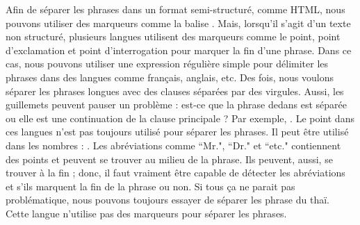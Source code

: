 \documentclass{KodeBook}
\begin{document}
Afin de séparer les phrases dans un format semi-structuré, comme HTML, nous pouvons utiliser des marqueurs comme la balise .
Mais, lorsqu'il s'agit d'un texte non structuré, plusieurs langues utilisent des marqueurs comme le point, point d'exclamation et point d'interrogation pour marquer la fin d'une phrase. 
Dans ce cas, nous pouvons utiliser une expression régulière simple \expword{/[.?!]/} pour délimiter les phrases dans des langues comme français, anglais, etc.
Des fois, nous voulons séparer les phrases longues avec des clauses séparées par des virgules.
Aussi, les guillemets peuvent pauser un problème : est-ce que la phrase dedans est séparée ou elle est une continuation de la clause principale ?
Par exemple, .
Le point dans ces langues n'est pas toujours utilisé pour séparer les phrases. 
Il peut être utilisé dans les nombres : .
Les abréviations comme ``Mr.", ``Dr." et ``etc." contiennent des points et peuvent se trouver au milieu de la phrase. 
Ils peuvent, aussi, se trouver à la fin ; donc, il faut vraiment être capable de détecter les abréviations et s'ils marquent la fin de la phrase ou non. 
Si tous ça ne parait pas problématique, nous pouvons toujours essayer de séparer les phrase du thaï. 
Cette langue n'utilise pas des marqueurs pour séparer les phrases.
\end{document}
